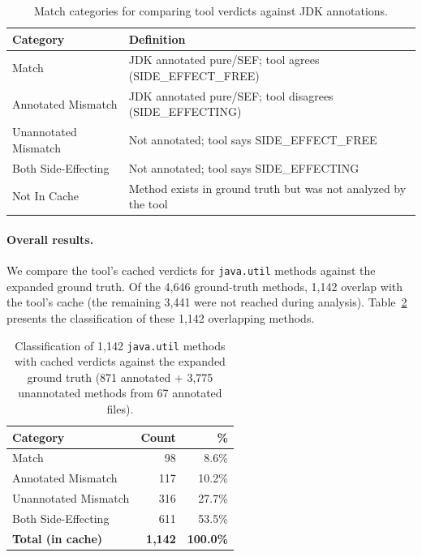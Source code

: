\begin{table}[H]
\centering
\caption{Match categories for comparing tool verdicts against JDK annotations.}
\label{tab:categories}
\begin{tabular}{lp{8cm}}
\toprule
\textbf{Category} & \textbf{Definition} \\
\midrule
Match & JDK annotated pure/SEF; tool agrees (SIDE\_EFFECT\_FREE) \\
Annotated Mismatch & JDK annotated pure/SEF; tool disagrees (SIDE\_EFFECTING) \\
Unannotated Mismatch & Not annotated; tool says SIDE\_EFFECT\_FREE \\
Both Side-Effecting & Not annotated; tool says SIDE\_EFFECTING \\
Not In Cache & Method exists in ground truth but was not analyzed by the tool \\
\bottomrule
\end{tabular}
\end{table}




\paragraph{Overall results.}
We compare the tool's cached verdicts for \texttt{java.util} methods against the expanded ground truth.
Of the 4,646 ground-truth methods, 1,142 overlap with the tool's cache (the remaining 3,441 were not reached during analysis).
Table~\ref{tab:results} presents the classification of these 1,142 overlapping methods.

\begin{table}[h]
\centering
\caption{Classification of 1,142 \texttt{java.util} methods with cached verdicts against the expanded ground truth (871 annotated + 3,775 unannotated methods from 67 annotated files).}
\label{tab:results}
\begin{tabular}{lrr}
\toprule
\textbf{Category} & \textbf{Count} & \textbf{\%} \\
\midrule
Match                 &    98 &  8.6\% \\
Annotated Mismatch    &   117 & 10.2\% \\
Unannotated Mismatch  &   316 & 27.7\% \\
Both Side-Effecting   &   611 & 53.5\% \\
\midrule
\textbf{Total (in cache)} & \textbf{1,142} & \textbf{100.0\%} \\
\bottomrule
\end{tabular}
\end{table}

